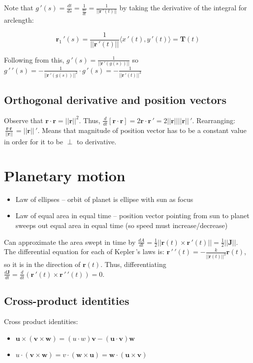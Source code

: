 Note that $g\,'(s)=\frac{dt}{ds}=\frac{1}{\frac{ds}{dt}}=\frac{1}{||\textbf{r}\,'(t)||}$ by taking the derivative of the integral for arclength:

\[\textbf{r}_1\,'(s)=\frac{1}{||\textbf{r}\,'(t)||}\langle x\,'(t),y\,'(t) \rangle=\textbf{T}(t)\]

Following from this, $g\,'(s)=\frac{1}{||\textbf{r}\,'(g(s))||}$ so $g\,'\,'(s)=-\frac{1}{||\textbf{r}\,'(g(s))||^2}\cdot g\,'(s)=-\frac{1}{||\textbf{r}\,'(t)||^3}$

\subsection{Orthogonal derivative and position vectors}

Observe that $\textbf{r}\cdot \textbf{r}=||\textbf{r}||^2$.
Thus, $\frac{d}{dt}[\textbf{r}\cdot \textbf{r}]=2\textbf{r}\cdot\textbf{r}\,'=2||\textbf{r}||||\textbf{r}||\,'$.
Rearranging: $\frac{\textbf{r}\cdot \textbf{r}}{||\textbf{r}||}=||\textbf{r}||\,'$.
Means that magnitude of position vector has to be a constant value in order for it
to be $\perp$ to derivative.

\section{Planetary motion}

\begin{itemize}
    \item Law of ellipses -- orbit of planet is ellipse with sun as focus
    \item Law of equal area in equal time -- position vector pointing from sun to planet sweeps out equal area in equal time (so speed must increase/decrease)
\end{itemize}

Can approximate the area swept in time by $\frac{dA}{dt}=\frac{1}{2}||\textbf{r}(t)\times \textbf{r}\,'(t)||=\frac{1}{2}||\textbf{J}||$.
The differential equation for each of Kepler\,'s laws is: $\textbf{r}\,'\,'(t)=-\frac{k}{||\textbf{r}(t)||^3}\textbf{r}(t)$, so it is in the direction of $\textbf{r}(t)$.
Thus, differentiating $\frac{d\textbf{J}}{dt}=\frac{d}{dt}(\textbf{r}\,'(t)\times \textbf{r}\,'\,'(t))=0$.

\subsection{Cross-product identities}

Cross product identities:
\begin{itemize}
    \item $\boxed{\textbf{u}\times(\textbf{v}\times \textbf{w})=(u\cdot w)\textbf{v}-(\textbf{u}\cdot \textbf{v})\textbf{w}}$
    \item $\boxed{u\cdot(\textbf{v}\times \textbf{w})=v\cdot(\textbf{w}\times \textbf{u})=\textbf{w}\cdot(\textbf{u}\times \textbf{v})}$
\end{itemize}
